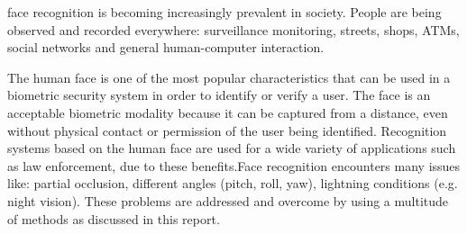 % 
% 
% 
% 

 face recognition is becoming increasingly prevalent in society. People are being observed and recorded everywhere: surveillance monitoring, streets, shops, ATMs, social networks and general human-computer interaction\cite{Forensics}.

The human face is one of the most popular
characteristics that can be used in a biometric security system in order to identify or verify a user. The face is an acceptable biometric
modality because it can be captured from a distance, even
without physical contact or permission of the user being identified. Recognition systems based on the human face are used for a wide variety of applications such as law enforcement, due to these benefits\cite{Occlusion&noise}\cite{NYTimes}.Face recognition encounters many issues like: partial occlusion, different angles (pitch, roll, yaw), lightning conditions (e.g. night vision). These problems are addressed and overcome by using a multitude of methods as discussed in this report.

